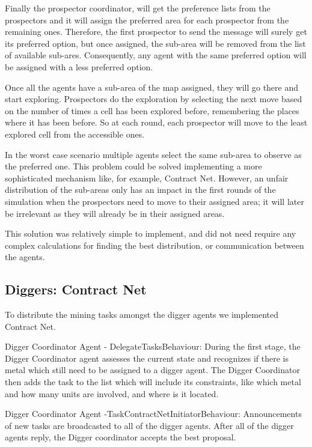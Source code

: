 Finally the prospector coordinator, will get the preference lists from the prospectors and it will assign the preferred area for each prospector from the remaining ones. Therefore, the first prospector to send the message will surely get its preferred option, but once assigned, the sub-area will be removed from the list of available sub-ares. Consequently, any agent with the same preferred option will be assigned with a less preferred option.

Once all the agents have a sub-area of the map assigned, they will go there and start exploring. Prospectors do the exploration by selecting the next move based on the number of times a cell has been explored before, remembering the places where it has been before. So at each round, each prospector will move to the least explored cell from the accessible ones. 

In the worst case scenario multiple agents select the same sub-area to observe as the preferred one. This problem could be solved implementing a more sophisticated mechanism like, for example, Contract Net. However, an unfair distribution of the sub-areas only has an impact in the first rounds of the simulation when the prospectors need to move to their assigned area; it will later be irrelevant as they will already be in their assigned areas. 

This solution was relatively simple to implement, and did not need require any complex calculations for finding the best distribution, or communication between the agents.


\subsection{Diggers: Contract Net}

To distribute the mining tasks amongst the digger agents we implemented Contract Net.

Digger Coordinator Agent - DelegateTasksBehaviour:
During the first stage, the Digger Coordinator agent assesses the current state and recognizes if there is metal which still need to be assigned to a digger agent. The Digger Coordinator then adds the task to the list which will include its constraints, like which metal and how many units are involved, and where is it located. 

Digger Coordinator Agent -TaskContractNetInitiatorBehaviour:
Announcements of new tasks are broadcasted to all of the digger agents. After all of the digger agents reply, the Digger coordinator accepts the best proposal. 

